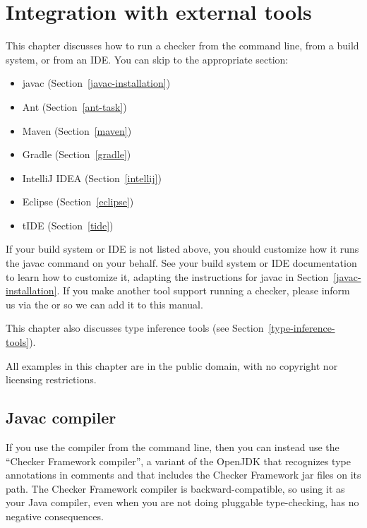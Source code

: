 \htmlhr
\chapter{Integration with external tools\label{external-tools}}

This chapter discusses how to run a checker from the command line, from a
build system, or from an IDE\@.  You can skip to the appropriate section:

\begin{itemize}
\item javac (Section~\ref{javac-installation})
\item Ant (Section~\ref{ant-task})
\item Maven (Section~\ref{maven})
\item Gradle (Section~\ref{gradle})
\item IntelliJ IDEA (Section~\ref{intellij})
\item Eclipse (Section~\ref{eclipse})
\item tIDE (Section~\ref{tide})
\end{itemize}

If your build system or IDE is not listed above, you should customize how
it runs the javac command on your behalf.  See your build system or IDE
documentation to learn how to
customize it, adapting the instructions for javac in Section~\ref{javac-installation}.
If you make another tool support running a checker, please
inform us via the
 or
 so
we can add it to this manual.

This chapter also discusses type inference tools (see
Section~\ref{type-inference-tools}).

All examples in this chapter are in the public domain, with no copyright nor
licensing restrictions.


\section{Javac compiler\label{javac-installation}}

If you use the  compiler from the command line, then you can
instead use the ``Checker Framework compiler'', a variant of the OpenJDK
 that recognizes type annotations in comments and that includes
the Checker Framework jar files on its path.
The Checker Framework compiler is backward-compatible, so using it as your
Java compiler, even when you are not doing pluggable type-checking, has no
negative consequences.

